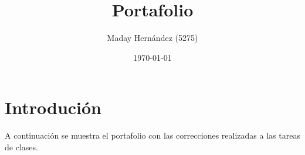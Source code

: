 \documentclass{article}
\begin{document}
\title{Portafolio}
\author{Maday Hernández (5275)}
\date{\today}
\maketitle

\section{Introdución}

A continuación se muestra el portafolio con las correcciones realizadas a las tareas de clases.











\end{document}

